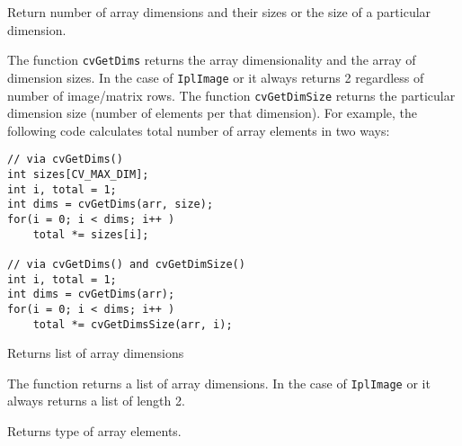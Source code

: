 Return number of array dimensions and their sizes or the size of a particular dimension.


\begin{description}
\end{description}

The function \texttt{cvGetDims} returns the array dimensionality and the
array of dimension sizes. In the case of \texttt{IplImage} or  it always
returns 2 regardless of number of image/matrix rows. The function
\texttt{cvGetDimSize} returns the particular dimension size (number of
elements per that dimension). For example, the following code calculates
total number of array elements in two ways:

\begin{lstlisting}
// via cvGetDims()
int sizes[CV_MAX_DIM];
int i, total = 1;
int dims = cvGetDims(arr, size);
for(i = 0; i < dims; i++ )
    total *= sizes[i];

// via cvGetDims() and cvGetDimSize()
int i, total = 1;
int dims = cvGetDims(arr);
for(i = 0; i < dims; i++ )
    total *= cvGetDimsSize(arr, i);
\end{lstlisting}
\fi

\ifPy
{}
Returns list of array dimensions


\begin{description}
\end{description}

The function returns a list of array dimensions.
In the case of \texttt{IplImage} or  it always
returns a list of length 2.
\fi


Returns type of array elements.


\begin{description}
\end{description}

